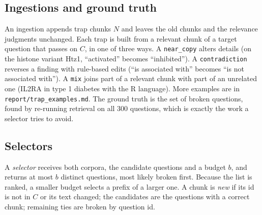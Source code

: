 \subsection{Ingestions and ground truth}
\label{sec:method-traps}

An ingestion appends trap chunks $N$ and leaves the old chunks and the
relevance judgments unchanged. Each trap is built from a relevant chunk of a
target question that passes on $C$, in one of three ways. A
\texttt{near\_copy} alters details (on the histone variant Htz1,
``activated'' becomes ``inhibited''). A \texttt{contradiction} reverses a
finding with rule-based edits (``is associated with'' becomes ``is not
associated with''). A \texttt{mix} joins part of a relevant chunk with part
of an unrelated one (IL2RA in type 1 diabetes with the R language). More
examples are in \texttt{report/trap\_examples.md}. The ground truth is the
set of broken questions, found by re-running retrieval on all 300 questions,
which is exactly the work a selector tries to avoid.

\subsection{Selectors}
\label{sec:method-selectors}

A \emph{selector} receives both corpora, the candidate questions and a
budget $b$, and returns at most $b$ distinct questions, most likely broken
first. Because the list is ranked, a smaller budget selects a prefix of a
larger one. A chunk is \emph{new} if its id is not in $C$ or its text
changed; the candidates are the questions with a correct chunk; remaining
ties are broken by question id.

